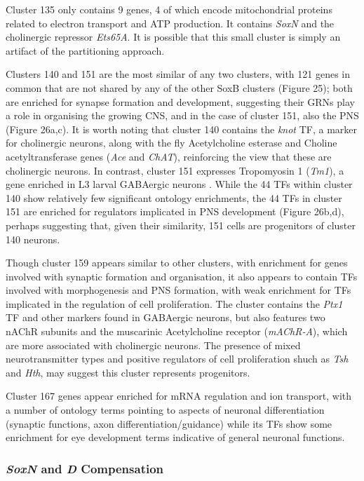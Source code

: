 \documentclass[withindex,glossary]{cam-thesis}
\begin{document}
Cluster 135 only contains 9 genes, 4 of which encode mitochondrial
proteins related to electron transport and ATP production. It contains
\emph{SoxN} and the cholinergic repressor \emph{Ets65A}. It is possible
that this small cluster is simply an artifact of the partitioning
approach.

Clusters 140 and 151 are the most similar of any two clusters, with 121
genes in common that are not shared by any of the other SoxB clusters
(Figure 25); both are enriched for synapse formation and development,
suggesting their GRNs play a role in organising the growing CNS, and in
the case of cluster 151, also the PNS (Figure 26a,c). It is worth noting
that cluster 140 contains the \emph{knot} TF, a marker for cholinergic
neurons, along with the fly Acetylcholine esterase and Choline
acetyltransferase genes (\emph{Ace} and \emph{ChAT}), reinforcing the
view that these are cholinergic neurons. In contrast, cluster 151
expresses Tropomyosin 1 (\emph{Tm1}), a gene enriched in L3 larval
GABAergic neurons . While the 44 TFs within
cluster 140 show relatively few significant ontology enrichments, the 44
TFs in cluster 151 are enriched for regulators implicated in PNS
development (Figure 26b,d), perhaps suggesting that, given their
similarity, 151 cells are progenitors of cluster 140 neurons.

Though cluster 159 appears similar to other clusters, with enrichment
for genes involved with synaptic formation and organisation, it also
appears to contain TFs involved with morphogenesis and PNS formation,
with weak enrichment for TFs implicated in the regulation of cell
proliferation. The cluster contains the \emph{Ptx1} TF and other markers
found in GABAergic neurons, but also features two nAChR subunits and the
muscarinic Acetylcholine receptor (\emph{mAChR-A}), which are more
associated with cholinergic neurons. The presence of mixed
neurotransmitter types and positive regulators of cell proliferation
shuch as \emph{Tsh} and \emph{Hth}, may suggest this cluster represents
progenitors.

Cluster 167 genes appear enriched for mRNA regulation and ion transport,
with a number of ontology terms pointing to aspects of neuronal
differentiation (synaptic functions, axon differentiation/guidance)
while its TFs show some enrichment for eye development terms indicative
of general neuronal functions.

\subsubsection{\emph{SoxN} and \emph{D} Compensation}
\end{document}
